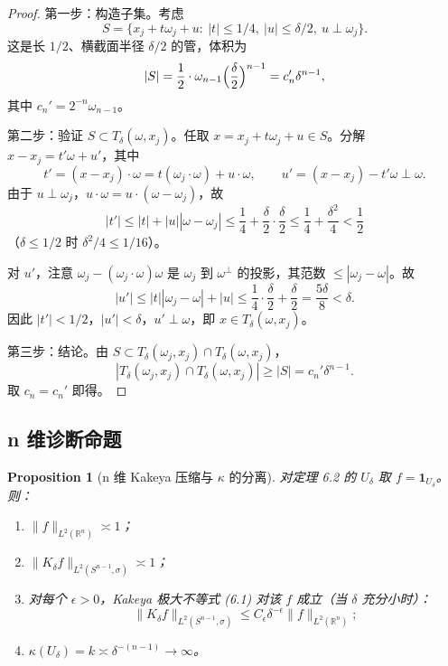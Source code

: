 \documentclass[11pt,a4paper]{article}
\newtheorem{proposition}[theorem]{Proposition}
\theoremstyle{remark}
\begin{document}
		\begin{proof}
		第一步：构造子集。考虑
		\[
		S=\bigl\{x_j+t\omega_j+u:\ |t|\le1/4,\ |u|\le\delta/2,\ u\perp\omega_j\bigr\}.
		\]
		这是长 $1/2$、横截面半径 $\delta/2$ 的管，体积为
		\[
		|S|=\frac12\cdot\omega_{n-1}\Bigl(\frac{\delta}{2}\Bigr)^{n-1}=c_n'\delta^{n-1},
		\]
		其中 $c_n'=2^{-n}\omega_{n-1}$。
		
		第二步：验证 $S\subset T_\delta(\omega,x_j)$。任取 $x=x_j+t\omega_j+u\in S$。分解 $x-x_j=t'\omega+u'$，其中
		\[
		t'=(x-x_j)\cdot\omega=t(\omega_j\cdot\omega)+u\cdot\omega,\qquad
		u'=(x-x_j)-t'\omega\perp\omega.
		\]
		由于 $u\perp\omega_j$，$u\cdot\omega=u\cdot(\omega-\omega_j)$，故
		\[
		|t'|\le|t|+|u||\omega-\omega_j|\le\frac14+\frac{\delta}{2}\cdot\frac{\delta}{2}\le\frac14+\frac{\delta^2}{4}<\frac12
		\]
		（$\delta\le1/2$ 时 $\delta^2/4\le1/16$）。
		
		对 $u'$，注意 $\omega_j-(\omega_j\cdot\omega)\omega$ 是 $\omega_j$ 到 $\omega^\perp$ 的投影，其范数 $\le|\omega_j-\omega|$。故
		\[
		|u'|\le|t||\omega_j-\omega|+|u|\le\frac14\cdot\frac{\delta}{2}+\frac{\delta}{2}
		=\frac{5\delta}{8}<\delta.
		\]
		因此 $|t'|<1/2$，$|u'|<\delta$，$u'\perp\omega$，即 $x\in T_\delta(\omega,x_j)$。
		
		第三步：结论。由 $S\subset T_\delta(\omega_j,x_j)\cap T_\delta(\omega,x_j)$，
		\[
		|T_\delta(\omega_j,x_j)\cap T_\delta(\omega,x_j)|\ge|S|=c_n'\delta^{n-1}.
		\]
		取 $c_n=c_n'$ 即得。
		\end{proof}
		
		\subsection{n 维诊断命题}
		\begin{proposition}[n 维 Kakeya 压缩与 $\kappa$ 的分离]
		对定理 6.2 的 $U_\delta$ 取 $f=\mathbf 1_{U_\delta}$。则：
		\begin{enumerate}
			\item[(i)] $\|f\|_{L^2(\mathbb R^n)}\asymp1$；
			\item[(ii)] $\|K_\delta f\|_{L^2(S^{n-1},\sigma)}\asymp1$；
			\item[(iii)] 对每个 $\epsilon>0$，Kakeya 极大不等式 (6.1) 对该 $f$ 成立（当 $\delta$ 充分小时）：
			\[
			\|K_\delta f\|_{L^2(S^{n-1},\sigma)}\le C_\epsilon\delta^{-\epsilon}\|f\|_{L^2(\mathbb R^n)};
			\]
			\item[(iv)] $\kappa(U_\delta)=k\asymp\delta^{-(n-1)}\to\infty$。
		\end{enumerate}
		\end{proposition}
		
\end{document}
